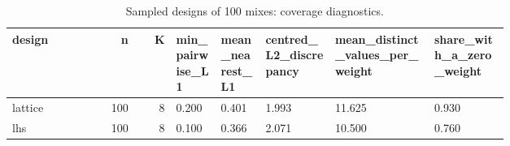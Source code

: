 \begin{table}[htbp]
\centering\tiny
\caption{Sampled designs of 100 mixes: coverage diagnostics.}
\label{tab:designs}
\setlength{\tabcolsep}{3pt}
\begin{tabular}{lrrp{0.099\linewidth}p{0.099\linewidth}p{0.146\linewidth}p{0.205\linewidth}p{0.159\linewidth}}
\toprule
design & n & K & min\_\allowbreak{}pairwise\_\allowbreak{}L1 & mean\_\allowbreak{}nearest\_\allowbreak{}L1 & centred\_\allowbreak{}L2\_\allowbreak{}discrepancy & mean\_\allowbreak{}distinct\_\allowbreak{}values\_\allowbreak{}per\_\allowbreak{}weight & share\_\allowbreak{}with\_\allowbreak{}a\_\allowbreak{}zero\_\allowbreak{}weight \\
\midrule
lattice & 100 & 8 & 0.200 & 0.401 & 1.993 & 11.625 & 0.930 \\
lhs & 100 & 8 & 0.100 & 0.366 & 2.071 & 10.500 & 0.760 \\
\bottomrule
\end{tabular}
\end{table}
